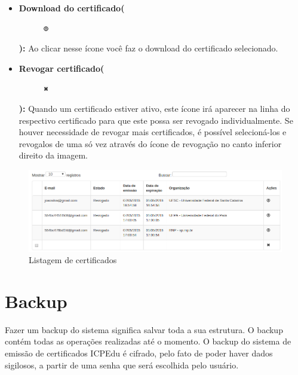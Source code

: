 \begin{itemize}

	\item \textbf{Download do certificado(}\begin{figure} \includegraphics[height=10]{images/iconedownload} \end{figure} \textbf{):} Ao clicar nesse ícone você faz o download do certificado selecionado.
	\item \textbf{Revogar certificado(}\begin{figure} \includegraphics[height=10]{images/iconedelete2} \end{figure} \textbf{):} Quando um certificado estiver ativo, este ícone irá aparecer na linha do respectivo certificado para que este possa ser revogado individualmente. Se houver necessidade de revogar mais certificados, é possível selecioná-los e revogalos de uma só vez através do ícone de revogação no canto inferior direito da imagem. 
	
\end{itemize}

\begin{figure}[ht]
     \centering
     \includegraphics[scale=0.5]{images/listarcert.png}
     \caption{Listagem de certificados}
     \label{fig:listarcert}
\end{figure}

\section{Backup}

Fazer um backup do sistema significa salvar toda a sua estrutura. O backup contém todas as operações realizadas até o momento. O backup do sistema de emissão de certificados ICPEdu é cifrado, pelo fato de poder haver dados sigilosos, a partir de uma senha que será escolhida pelo usuário.

